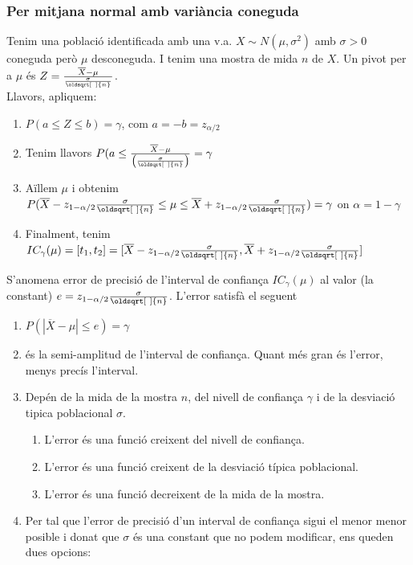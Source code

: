 \documentclass[a4paper]{sciposter}
\renewcommand*{\sqrt}[2][\ ]{\oldsqrt[#1]{#2} }
\begin{document}
\begin{multicols}{3}
\subsubsection{Per mitjana normal amb variància coneguda}
Tenim una població identificada amb una v.a. $X \sim N(\mu, \sigma^2)$ amb $\sigma > 0$ coneguda però $\mu$ desconeguda. I tenim una mostra de mida $n$ de $X$. Un pivot per a $\mu$ és $Z = \frac{\overline{X} - \mu}{\frac{\sigma}{\sqrt{n}}}$.\\
Llavors, apliquem:
\begin{enumerate}
    \item $P(a\leq Z\leq b) = \gamma$, com $a = -b = z_{\alpha/2}$
    \item Tenim llavors $P(a\leq\frac{\overline{X}-\mu}{\left(\frac{\sigma}{\sqrt{n}}\right)} = \gamma$
    \item Aïllem $\mu$ i obtenim $P(\overline{X} - z_{1-\alpha/2}\frac{\sigma}{\sqrt{n}} \leq \mu \leq \overline{X} + z_{1-\alpha/2}\frac{\sigma}{\sqrt{n}}) = \gamma$ on $\boxed{\alpha = 1-\gamma}$
    \item Finalment, tenim\\$IC_\gamma(\mu) = [t_1, t_2] = [\overline{X} - z_{1-\alpha/2}\frac{\sigma}{\sqrt{n}}, \overline{X} + z_{1-\alpha/2}\frac{\sigma}{\sqrt{n}}]$
\end{enumerate}
S'anomena error de precisió de l'interval de confiança $IC_\gamma(\mu)$ al valor (la constant) $e = z_{1-\alpha/2}\frac{\sigma}{\sqrt{n}}$.
L'error satisfà el seguent
\begin{enumerate}
	\item $P(|\overline{X} - \mu| \leq e) = \gamma$
	\item és la semi-amplitud de l'interval de confiança. Quant més gran és l'error, menys precís l'interval.
	\item Depén de la mida de la mostra $n$, del nivell de confiança $\gamma$ i de la desviació tipica poblacional $\sigma$.
	\begin{enumerate}
		\item L'error és una funció creixent del nivell de confiança.
		\item L'error és una funció creixent de la desviació típica poblacional.
		\item L'error és una funció decreixent de la mida de la mostra.
	\end{enumerate}
	\item Per tal que l'error de precisió d'un interval de confiança sigui el menor menor posible i donat que $\sigma$ és una constant que no podem modificar, ens queden dues opcions:

\end{enumerate}
\end{multicols}
\end{document}
